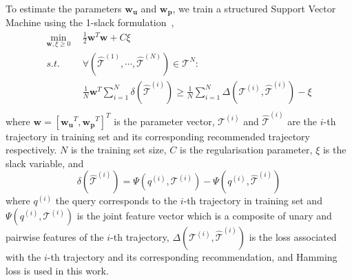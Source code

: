 To estimate the parameters $\mathbf{w_u}$ and $\mathbf{w_p}$, we train a structured Support Vector Machine
using the 1-slack formulation~\cite{ssvm09},
\begin{align*}
    \min_{\mathbf{w}, \xi \ge 0} ~~& \frac{1}{2} \mathbf{w}^T \mathbf{w} + C \xi \\
    s.t. ~~& \forall \left( \hat{\mathcal{T}}^{(1)}, \cdots, \hat{\mathcal{T}}^{(N)} \right) \in \mathscr{T}^N: \\
         ~~& \frac{1}{N} \mathbf{w}^T \sum_{i=1}^N \delta \left( \hat{\mathcal{T}}^{(i)} \right) \ge
             \frac{1}{N} \sum_{i=1}^N \Delta \left( \mathcal{T}^{(i)}, \hat{\mathcal{T}}^{(i)} \right) - \xi \\
\end{align*}
where $\mathbf{w} = [\mathbf{w_u}^T, \mathbf{w_p}^T]^T$ is the parameter vector,
$\mathcal{T}^{(i)}$ and $\hat{\mathcal{T}}^{(i)}$ are the $i$-th trajectory in training set
and its corresponding recommended trajectory respectively.
$N$ is the training set size, $C$ is the regularisation parameter,
$\xi$ is the slack variable, and
\begin{displaymath}
    \delta \left( \hat{\mathcal{T}}^{(i)} \right) = \Psi \left( q^{(i)}, \mathcal{T}^{(i)} \right) - 
                                                    \Psi \left( q^{(i)}, \hat{\mathcal{T}}^{(i)} \right)
\end{displaymath}
where $q^{(i)}$ the query corresponds to the $i$-th trajectory in training set and
$\Psi \left( q^{(i)}, \mathcal{T}^{(i)} \right)$ is the joint feature vector which is a composite of unary and 
pairwise features of the $i$-th trajectory,
$\Delta \left( \mathcal{T}^{(i)}, \hat{\mathcal{T}}^{(i)} \right)$ is the loss associated with the $i$-th trajectory 
and its corresponding recommendation, and Hamming loss is used in this work.
